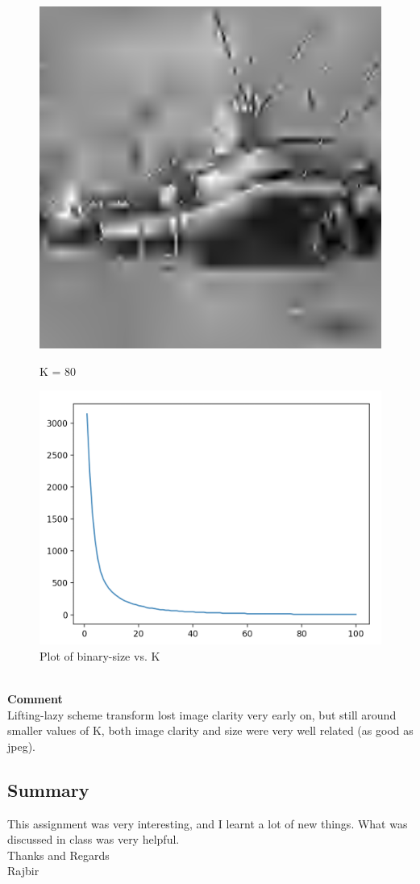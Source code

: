 \documentclass{article}
\begin{document}
    \begin{figure}[!htb]
      \includegraphics[scale=0.4]{./compression/3/80.png}
      \caption{K = 80}
    \endminipage \hfill
      \includegraphics[scale=.4]{./compression/plots/bn.png}
      \caption{Plot of binary-size vs. K}
    \endminipage
    \end{figure}
    \\
    \textbf{Comment}\\
    Lifting-lazy scheme transform lost image clarity very early on, but still around smaller values of K, both image clarity and size were very well related (as good as jpeg).

\pagebreak
\subsection*{Summary}
    This assignment was very interesting, and I learnt a lot of new things. What was discussed in class was very helpful. \\
    Thanks and Regards\\
    Rajbir
\end{document}
